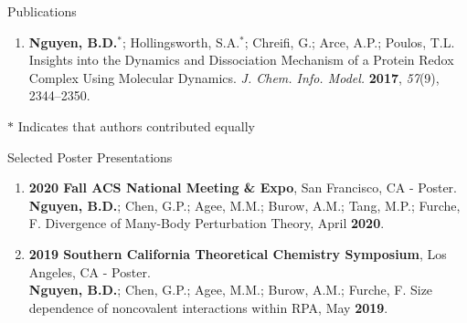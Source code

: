 \documentclass{resume} %
\begin{document}
\begin{rSection}{Publications}
\begin{enumerate}
\item \textbf{Nguyen, B.D.}$^*$; Hollingsworth, S.A.$^*$; Chreifi, G.;
  Arce, A.P.; Poulos, T.L. Insights into the Dynamics and Dissociation Mechanism
  of a Protein Redox Complex Using Molecular Dynamics. \textit{J. Chem. Info. Model.}
  \textbf{2017}, \textit{57}(9), 2344--2350.

%
%
  
\end{enumerate}

$*$ Indicates that authors contributed equally

\end{rSection}

\begin{rSection}{Selected Poster Presentations}
  \begin{enumerate}

  \item \textbf{2020 Fall ACS National Meeting \& Expo}, San Francisco, CA - Poster. \\
  \textbf{Nguyen, B.D.}; Chen, G.P.; Agee, M.M.; Burow, A.M.; Tang, M.P.;
  Furche, F. Divergence of Many-Body Perturbation Theory, April \textbf{2020}.
  
  \item \textbf{2019 Southern California Theoretical Chemistry Symposium}, Los Angeles, CA - Poster. \\
  \textbf{Nguyen, B.D.}; Chen, G.P.; Agee, M.M.; Burow, A.M.; Furche, F.  
  Size dependence of noncovalent interactions within RPA, May \textbf{2019}.
  \end{enumerate}
  
\end{rSection}
\end{document}

